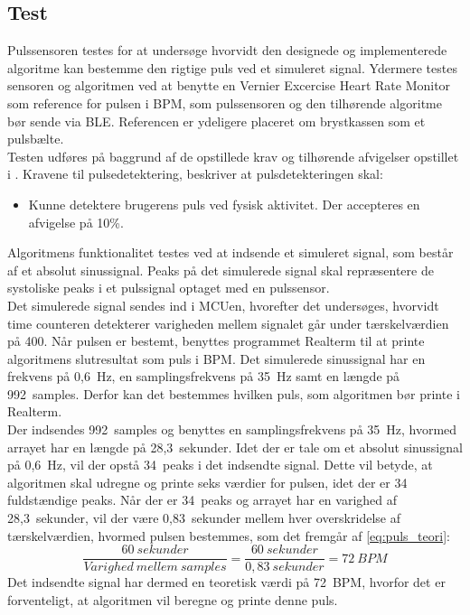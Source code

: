 \subsection{Test}
Pulssensoren testes for at undersøge hvorvidt den designede og implementerede algoritme kan bestemme den rigtige puls ved et simuleret signal. Ydermere testes sensoren og algoritmen ved at benytte en Vernier Excercise Heart Rate Monitor som reference for pulsen i BPM, som pulssensoren og den tilhørende algoritme bør sende via BLE. Referencen er ydeligere placeret om brystkassen som et pulsbælte. \\
Testen udføres på baggrund af de opstillede krav og tilhørende afvigelser opstillet i . Kravene til pulsedetektering, beskriver at pulsdetekteringen skal:
\begin{itemize}
\item Kunne detektere brugerens puls ved fysisk aktivitet. Der accepteres en afvigelse på 10\%.
\end{itemize}
Algoritmens funktionalitet testes ved at indsende et simuleret signal, som består af et absolut sinussignal. Peaks på det simulerede signal skal repræsentere de systoliske peaks i et pulssignal optaget med en pulssensor.\\
Det simulerede signal sendes ind i MCUen, hvorefter det undersøges, hvorvidt time counteren detekterer varigheden mellem signalet går under tærskelværdien på 400. Når pulsen er bestemt, benyttes programmet Realterm til at printe algoritmens slutresultat som puls i BPM. Det simulerede sinussignal har en frekvens på 0,6~Hz, en samplingsfrekvens på 35~Hz samt en længde på 992~samples. Derfor kan det bestemmes hvilken puls, som algoritmen bør printe i Realterm. \\
Der indsendes 992~samples og benyttes en samplingsfrekvens på 35~Hz, hvormed arrayet har en længde på 28,3~sekunder. Idet der er tale om et absolut sinussignal på 0,6~Hz, vil der opstå 34~peaks i det indsendte signal. Dette vil betyde, at algoritmen skal udregne og printe seks værdier for pulsen, idet der er 34 fuldstændige peaks. Når der er 34~peaks og arrayet har en varighed af 28,3~sekunder, vil der være 0,83~sekunder mellem hver overskridelse af tærskelværdien, hvormed pulsen bestemmes, som det fremgår af \eqref{eq:puls_teori}:
\begin{equation}
\frac{60~sekunder}{Varighed~mellem~samples} = \frac{60~sekunder}{0,83~sekunder} = 72~BPM
\label{eq:puls_teori}
\end{equation} 
Det indsendte signal har dermed en teoretisk værdi på 72~BPM, hvorfor det er forventeligt, at algoritmen vil beregne og printe denne puls.

